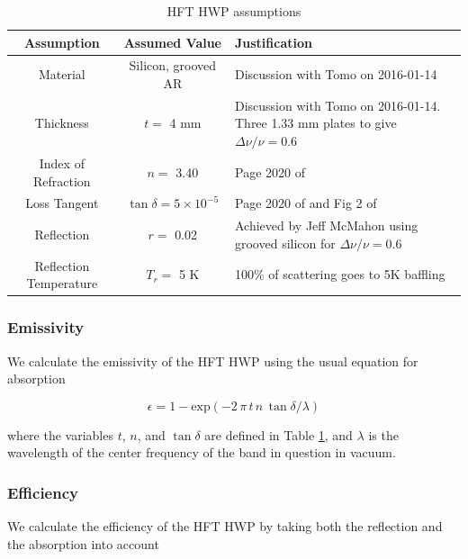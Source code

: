 \documentclass[12pt, titlepage]{article} %
\begin{document}
\begin{table}[H]
	\centering
	\begin{tabularx}{\textwidth}{|| c | c | X ||}
	\hline
	Assumption & Assumed Value & Justification \\
	\hline
	\hline
	Material & Silicon, grooved AR & Discussion with Tomo on 2016-01-14 \\
	\hline
	Thickness & $t =$ 4 mm & Discussion with Tomo on 2016-01-14. Three 1.33 mm plates to give $\Delta \nu / \nu = 0.6$ \\
	\hline
	Index of Refraction & $n =$ 3.40 & Page 2020 of \cite{lamb} \\
	\hline
	Loss Tangent & $\tan{\delta} = \mathrm{5 \times 10^{-5}}$ & Page 2020 of \cite{lamb} and Fig 2 of \cite{parshin} \\
	\hline
	Reflection & $r =$ 0.02 & Achieved by Jeff McMahon using grooved silicon for $\Delta \nu / \nu = 0.6$ \\
	\hline
	Reflection Temperature & $T_{r} =$ 5 K & 100\% of scattering goes to 5K baffling \\
	\hline
	\end{tabularx}
\caption{HFT HWP assumptions \label{table:hftHwpAssmp}}
\end{table}


\subsubsection{Emissivity}

We calculate the emissivity of the HFT HWP using the usual equation for absorption \cite{lamb}

\begin{equation}
	\epsilon = 1 - \mathrm{exp} (- 2 \, \pi \, t \, n \, \tan{\delta} / \lambda )
	\label{eq:hftHwpDielLoss}
\end{equation}

where the variables $t$, $n$, and $\tan{\delta}$ are defined in Table \ref{table:hftHwpAssmp}, and $\lambda$ is the wavelength of the center frequency of the band in question in vacuum. 


\subsubsection{Efficiency}

We calculate the efficiency of the HFT HWP by taking both the reflection and the absorption into account
\end{document}
